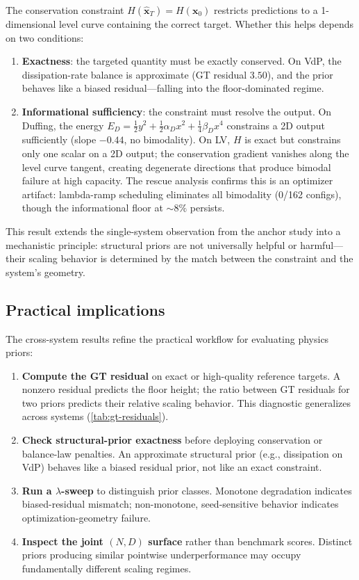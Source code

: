 \documentclass[11pt]{article}
\begin{document}
The conservation constraint $H(\hat{\bm{x}}_T) = H(\bm{x}_0)$ restricts predictions to a 1-dimensional level curve containing the correct target.
Whether this helps depends on two conditions:
\begin{enumerate}[leftmargin=*]
    \item \textbf{Exactness}: the targeted quantity must be exactly conserved.
    On VdP, the dissipation-rate balance is approximate (GT residual $3.50$), and the prior behaves like a biased residual---falling into the floor-dominated regime.
    \item \textbf{Informational sufficiency}: the constraint must resolve the output.
    On Duffing, the energy $E_D = \frac{1}{2}y^2 + \frac{1}{2}\alpha_D x^2 + \frac{1}{4}\beta_D x^4$ constrains a 2D output sufficiently (slope $-0.44$, no bimodality).
    On LV, $H$ is exact but constrains only one scalar on a 2D output; the conservation gradient vanishes along the level curve tangent, creating degenerate directions that produce bimodal failure at high capacity.
    The rescue analysis confirms this is an optimizer artifact: lambda-ramp scheduling eliminates all bimodality (0/162 configs), though the informational floor at $\sim\!8\%$ persists.
\end{enumerate}

This result extends the single-system observation from the anchor study into a mechanistic principle: structural priors are not universally helpful or harmful---their scaling behavior is determined by the match between the constraint and the system's geometry.

\subsection{Practical implications}

The cross-system results refine the practical workflow for evaluating physics priors:

\begin{enumerate}[leftmargin=*]
    \item \textbf{Compute the GT residual} on exact or high-quality reference targets.
    A nonzero residual predicts the floor height; the ratio between GT residuals for two priors predicts their relative scaling behavior.
    This diagnostic generalizes across systems (\cref{tab:gt-residuals}).
    \item \textbf{Check structural-prior exactness} before deploying conservation or balance-law penalties.
    An approximate structural prior (e.g., dissipation on VdP) behaves like a biased residual prior, not like an exact constraint.
    \item \textbf{Run a $\lambda$-sweep} to distinguish prior classes.
    Monotone degradation indicates biased-residual mismatch; non-monotone, seed-sensitive behavior indicates optimization-geometry failure.
    \item \textbf{Inspect the joint $(N,D)$ surface} rather than benchmark scores.
    Distinct priors producing similar pointwise underperformance may occupy fundamentally different scaling regimes.
\end{enumerate}
\end{document}
